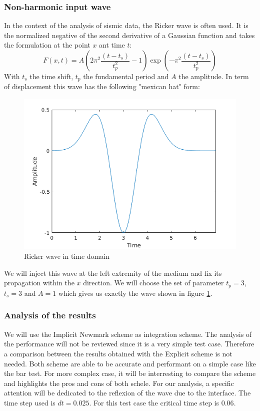 \subsubsection{Non-harmonic input wave}
In the context of the analysis of sismic data, the Ricker wave is often used. It is the normalized negative of the second derivative of a Gaussian function and takes the formulation at the point $x$ ant time $t$:
\begin{equation}
F(x,t) = A \left(2 \pi^2 \frac{(t-t_s)}{t_p^2} -1\right) \exp\left(-\pi^2 \frac{(t-t_s)}{t_p^2}\right)
\end{equation}   
With $t_s$ the time shift, $t_p$ the fundamental period and $A$ the amplitude.
In term of displacement this wave has the following "mexican hat" form:
\begin{figure}[H]
  \centering
  \includegraphics[scale=0.8]{images/ricker.png}
  \caption{Ricker wave in time domain}
  \label{fig:Ricker}
\end{figure}  
We will inject this wave at the left extremity of the medium and fix its propagation within the $x$ direction. We will choose the set of parameter $t_p = 3$, $t_s = 3$ and $A = 1$ which gives us exactly the wave shown in figure \ref{fig:Ricker}.
\subsubsection{Analysis of the results}
We will use the Implicit Newmark scheme as integration scheme. The analysis of the performance will not be reviewed since it is a very simple test case. Therefore a comparison between the results obtained with the Explicit scheme is not needed. Both scheme are able to be accurate and performant on a simple case like the bar test. For more complex case, it will be interresting to compare the scheme and highlights the pros and cons of both schele. For our analysis, a specific attention will be dedicated to the reflexion of the wave due to the interface. The time step used is $dt = 0.025$. For this test case the critical time step is $0.06$.\\ 

